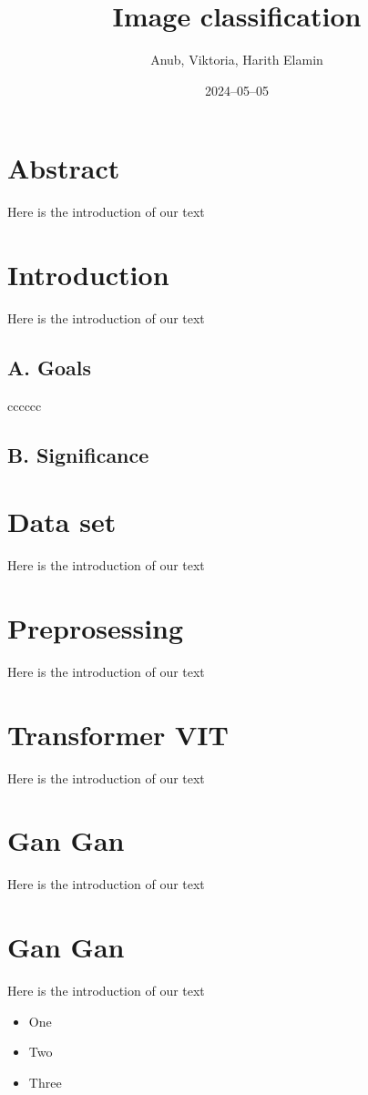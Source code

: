 \documentclass[12pt]{article}
\title{Image classification}
\author{Anub, Viktoria, Harith Elamin}
\date{2024–05–05}
\begin{document}
\maketitle

\section{Abstract}

Here is the introduction of our text

\section{Introduction}

Here is the introduction of our text
\subsection*{A. Goals}
cccccc
\subsection*{B. Significance}


\section{Data set}

Here is the introduction of our text

\section{Preprosessing}

Here is the introduction of our text

\section{Transformer VIT}

Here is the introduction of our text

\section{Gan Gan}

Here is the introduction of our text

\section{Gan Gan}

Here is the introduction of our text

\begin{itemize}

\item One

\item Two

\item Three

\end{itemize}
\end{document}
